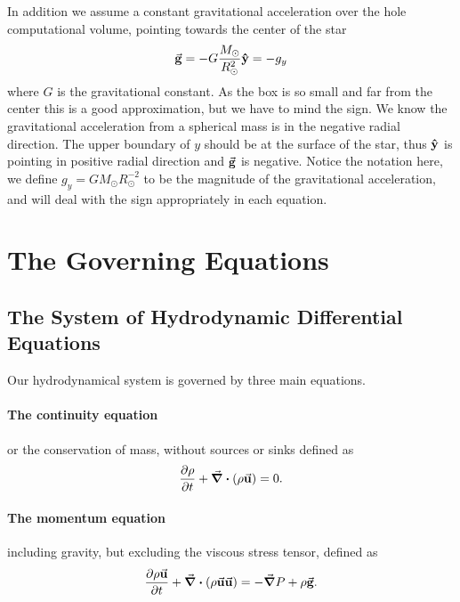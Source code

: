 \documentclass[11pt,a4paper,twocolumn,titlepage]{article}
\begin{document}
In addition we assume a constant gravitational acceleration over the hole computational volume, pointing towards the center of the star
\begin{equation*}
\va{g} = -G\frac{M_\odot}{R_\odot^2}\vu{y} =- g_y \label{eq:Gravitational acceleration}
\end{equation*}
where $G$ is the gravitational constant. As the box is so small and far from the center this is a good approximation, but we have to mind the sign. We know the gravitational acceleration from a spherical mass is in the negative radial direction. The upper boundary of $y$ should be at the surface of the star, thus $\vu{y}$ is pointing in positive radial direction and $\va{g}$ is negative. Notice the notation here, we define $g_y = GM_\odot R_\odot^{-2}$ to be the magnitude of the gravitational acceleration, and will deal with the sign appropriately in each equation.


\section{The Governing Equations}\label{sec:Governing eqs}

\subsection{The System of Hydrodynamic Differential Equations}\label{subsec:Gov/Hydrodynamic eqs.}
Our hydrodynamical system is governed by three main equations.
\paragraph{The continuity equation} or the conservation of mass, without sources or sinks defined as
\begin{equation}
\pdv{\rho}{t} + \div(\rho \va{u}) = 0.
\label{eq:Continuity eq}
\end{equation}
\paragraph{The momentum equation} including gravity, but excluding the viscous stress tensor, defined as
\begin{equation}
\pdv{\rho\va{u}}{t} + \div(\rho\va{u}\va{u}) = - \grad{P}+\rho \va{g}.
\label{eq:Momentum eq}
\end{equation}
\end{document}
